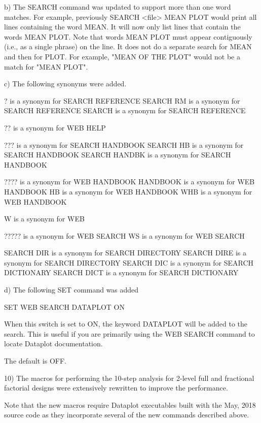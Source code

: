     b) The SEARCH command was updated to support more than one
       word matches.  For example, previously
       SEARCH <file> MEAN PLOT would print all lines containing the
       word MEAN.  It will now only list lines that contain the
       words MEAN PLOT.  Note that words MEAN PLOT must appear
       contiguously (i.e., as a single phrase) on the line.
       It does not do a separate search for MEAN and then for
       PLOT.  For example, "MEAN OF THE PLOT" would not be a
       match for "MEAN PLOT".

    c) The following synonyms were added.

          ? is a synonym for SEARCH REFERENCE
          SEARCH RM is a synonym for SEARCH REFERENCE
          SEARCH is a synonym for SEARCH REFERENCE

          ?? is a synonym for WEB HELP

          ??? is a synonym for SEARCH HANDBOOK
          SEARCH HB is a synonym for SEARCH HANDBOOK
          SEARCH HANDBK is a synonym for SEARCH HANDBOOK

          ???? is a synonym for WEB HANDBOOK
          HANDBOOK is a synonym for WEB HANDBOOK
          HB is a synonym for WEB HANDBOOK
          WHB is a synonym for WEB HANDBOOK

          W is a synonym for WEB

          ????? is a synonym for WEB SEARCH
          WS is a synonym for WEB SEARCH

          SEARCH DIR is a synonym for SEARCH DIRECTORY
          SEARCH DIRE is a synonym for SEARCH DIRECTORY
          SEARCH DIC is a synonym for SEARCH DICTIONARY
          SEARCH DICT is a synonym for SEARCH DICTIONARY

    d) The following SET command was added

          SET WEB SEARCH DATAPLOT ON

       When this switch is set to ON, the keyword DATAPLOT will be added
       to the search.  This is useful if you are primarily using the
       WEB SEARCH command to locate Dataplot documentation.

       The default is OFF.

10) The macros for performing the 10-step analysis for 2-level full and
    fractional factorial designs were extensively rewritten to improve
    the performance.

    Note that the new macros require Dataplot executables built with the
    May, 2018 source code as they incorporate several of the new
    commands described above.

